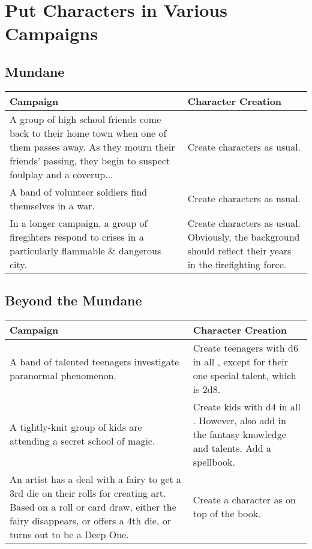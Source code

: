 \section{Put Characters in Various Campaigns}
\subsection{Mundane}
\begin{center}
	\begin{xltabular}{\textwidth}{XX}
		Campaign & Character Creation \\
		\hline
		A group of high school friends come back to their home town when one of them passes away. As they mourn their friends' passing, they begin to suspect foulplay and a coverup... & Create characters as usual. \\
		A band of volunteer soldiers find themselves in a war. & Create characters as usual. \\
		In a longer campaign, a group of firegihters respond to crises in a particularly flammable \& dangerous city. & Create characters as usual. Obviously, the background should reflect their years in the firefighting force. \\
	\end{xltabular}
\end{center}


\subsection{Beyond the Mundane}
\begin{center}
	\begin{xltabular}{\textwidth}{XX}
		Campaign & Character Creation \\
		\hline
		A band of talented teenagers investigate paranormal phenomenon.
			& Create teenagers with d6 in all , except for their one special talent, which is 2d8.\\
   		A tightly-knit group of kids are attending a secret school of magic.
			& Create kids with d4 in all . However, also add in the fantasy knowledge and talents. Add a spellbook. \\
		An artist has a deal with a fairy to get a 3rd die on their  rolls for creating art.
			Based on a roll or card draw, either the fairy disappears, or offers a 4th die, or turns out to be a Deep One.
			& Create a  character as on top of the book. \\
	\end{xltabular}
\end{center}

